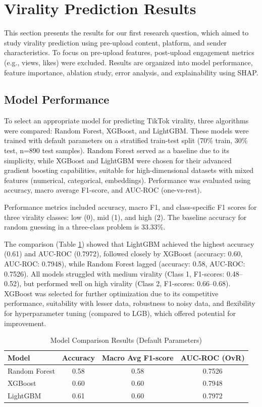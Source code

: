\documentclass[12pt,a4paper]{report}
\begin{document}
\section{Virality Prediction Results}
This section presents the results for our first research question, which aimed to study virality prediction using pre-upload content, platform, and sender characteristics. To focus on pre-upload features, post-upload engagement metrics (e.g., views, likes) were excluded. Results are organized into model performance, feature importance, ablation study, error analysis, and explainability using SHAP.


\subsection{Model Performance}
\label{sec:model_selection}
To select an appropriate model for predicting TikTok virality, three algorithms were compared: Random Forest, XGBoost, and LightGBM. These models were trained with default parameters on a stratified train-test split (70\% train, 30\% test, n=890 test samples). Random Forest served as a baseline due to its simplicity, while XGBoost and LightGBM were chosen for their advanced gradient boosting capabilities, suitable for high-dimensional datasets with mixed features (numerical, categorical, embeddings). Performance was evaluated using accuracy, macro average F1-score, and AUC-ROC (one-vs-rest).

Performance metrics included accuracy, macro F1, and class-specific F1 scores for three virality classes: low (0), mid (1), and high (2). The baseline accuracy for random guessing in a three-class problem is 33.33\%.

The comparison (Table \ref{tab:model_performance}) showed that LightGBM achieved the highest accuracy (0.61) and AUC-ROC (0.7972), followed closely by XGBoost (accuracy: 0.60, AUC-ROC: 0.7948), while Random Forest lagged (accuracy: 0.58, AUC-ROC: 0.7526). All models struggled with medium virality (Class 1, F1-scores: 0.48–0.52), but performed well on high virality (Class 2, F1-scores: 0.66–0.68). XGBoost was selected for further optimization due to its competitive performance, suitability with lesser data, robustness to noisy data, and flexibility for hyperparameter tuning (compared to LGB), which offered potential for improvement.

\begin{table}[h]
\centering
\caption{Model Comparison Results (Default Parameters)}
\label{tab:model_performance}
\begin{tabular}{lccc}
\toprule
\textbf{Model} & \textbf{Accuracy} & \textbf{Macro Avg F1-score} & \textbf{AUC-ROC (OvR)} \\
\midrule
Random Forest & 0.58 & 0.58 & 0.7526 \\
XGBoost       & 0.60 & 0.60 & 0.7948 \\
LightGBM      & 0.61 & 0.60 & 0.7972 \\
\bottomrule
\end{tabular}
\end{table}
\end{document}

